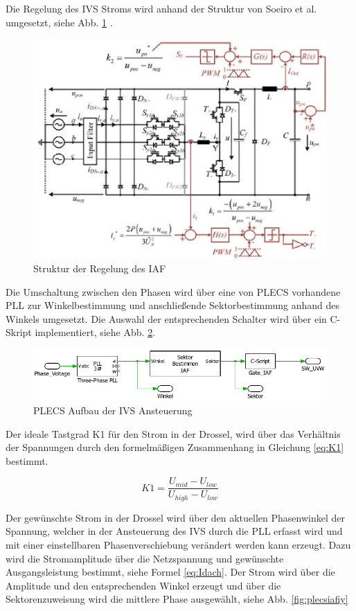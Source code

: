 		Die Regelung des \gls{IVS} Stroms wird anhand der Struktur von Soeiro et al. umgesetzt, siehe Abb. \ref{fig:iafpapercontrol} \cite{Soeiro.2013}. 
		 \begin{figure}[H]
			\centering
			\includegraphics[width=0.7\linewidth]{content/Grafiken/IAF_Paper_Control}
			\caption{Struktur der Regelung des IAF \cite{Soeiro.2013}}
			\label{fig:iafpapercontrol}
		\end{figure}
		Die Umschaltung zwischen den Phasen wird über eine von \gls{PLECS} vorhandene \gls{PLL} zur Winkelbestimmung und anschließende Sektorbestimmung anhand des Winkels umgesetzt. Die Auswahl der entsprechenden Schalter wird über ein C-Skript implementiert, siehe Abb. \ref{fig:plecsiafivscontrol}. 
		\begin{figure}[H]
			\centering
			\includegraphics[width=1\linewidth]{content/Grafiken/PlecsIAFivscontrol}
			\caption{PLECS Aufbau der \gls{IVS} Ansteuerung}
			\label{fig:plecsiafivscontrol}
		\end{figure}
		Der ideale Tastgrad K1 für den Strom in der Drossel, wird über das Verhältnis der Spannungen durch den formelmäßigen Zusammenhang in Gleichung \ref{eq:K1} bestimmt. 
		

		
		\begin{equation}
			\label{eq:K1}
			K1 = \dfrac{U_{mid}- U_{low}}{U_{high} -U_{low}} 
		\end{equation}
		
		Der gewünschte Strom in der Drossel wird über den aktuellen Phasenwinkel der Spannung, welcher in der Ansteuerung des \gls{IVS} durch die \gls{PLL} erfasst wird und mit einer einstellbaren Phasenverschiebung verändert werden kann erzeugt. Dazu wird die Stromamplitude über die Netzspannung und gewünschte Ausgangsleistung bestimmt, siehe Formel \ref{eq:Idach}. Der Strom wird über die Amplitude und den entsprechenden Winkel erzeugt und über die Sektorenzuweisung wird die mittlere Phase ausgewählt, siehe Abb. \ref{fig:plecsiafiy} 
		
